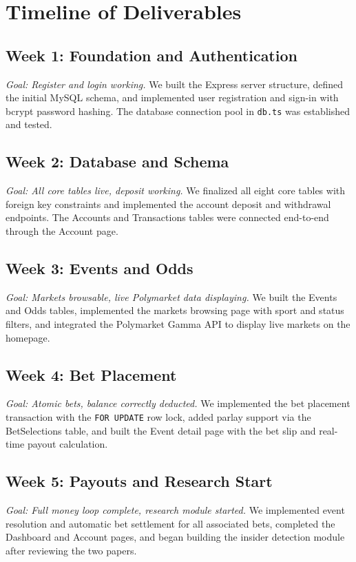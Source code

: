 \documentclass[sigconf,nonacm]{acmart}
\begin{document}
\section{Timeline of Deliverables}

\subsection{Week 1: Foundation and Authentication}
\textit{Goal: Register and login working.} We built the Express
server structure, defined the initial MySQL schema, and implemented
user registration and sign-in with bcrypt password hashing. The
database connection pool in \texttt{db.ts} was established and tested.

\subsection{Week 2: Database and Schema}
\textit{Goal: All core tables live, deposit working.} We finalized
all eight core tables with foreign key constraints and implemented the
account deposit and withdrawal endpoints. The Accounts and Transactions
tables were connected end-to-end through the Account page.

\subsection{Week 3: Events and Odds}
\textit{Goal: Markets browsable, live Polymarket data displaying.} We
built the Events and Odds tables, implemented the markets browsing
page with sport and status filters, and integrated the Polymarket Gamma
API to display live markets on the homepage.

\subsection{Week 4: Bet Placement}
\textit{Goal: Atomic bets, balance correctly deducted.} We implemented
the bet placement transaction with the \texttt{FOR UPDATE} row lock,
added parlay support via the BetSelections table, and built the Event
detail page with the bet slip and real-time payout calculation.

\subsection{Week 5: Payouts and Research Start}
\textit{Goal: Full money loop complete, research module started.} We
implemented event resolution and automatic bet settlement for all
associated bets, completed the Dashboard and Account pages, and began
building the insider detection module after reviewing the two papers.
\end{document}
